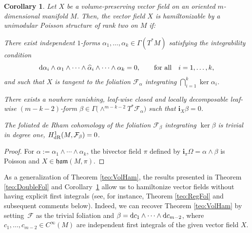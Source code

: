 \documentclass[pdftex]{sigma}%
\newcommand{\dd}{{\rm d}}
\newcommand{\ii}{\mathbf{i}}
\numberwithin{equation}{section}
\newtheorem{Corollary}[Theorem]{Corollary}
\begin{document}
\begin{Corollary}\label{cor:DoubleFol}
Let $X$ be a volume-preserving vector field on an oriented $m$-dimensional mani\-fold $M$. Then, the vector field $X$ is hamiltonizable by a unimodular Poisson structure of rank two on $M$ if:
 \begin{enumerate}\itemsep=0pt
 \item[$1.$] There exist independent $1$-forms $\alpha_1,\dots,\alpha_k\in\Gamma(T^{*}M)$ satisfying the integrability condition
 \begin{equation*}%
 \dd\alpha_{i} \wedge \alpha_{1} \wedge \cdots \wedge \widehat{\alpha}_{i} \wedge \cdots \wedge \alpha_{k} = 0, \qquad \text{for all}\quad i=1,\dots,k,
 \end{equation*}
 and such that $X$ is tangent to the foliation $\mathcal{F}_{\alpha}$ integrating $\bigcap_{i=1}^{k}\ker\alpha_{i}$.
{\sloppy \item [$2.$] There exists a nowhere vanishing, leaf-wise closed and locally decomposable leaf-wise $(m-k-2)$-form $\beta \in \Gamma\big({\wedge}^{m-k-2}T^{*}\mathcal{F}_{\alpha}\big)$ such that $\ii_{X}\beta = 0$.

}

 \item[$3.$] The foliated de Rham cohomology of the foliation $\mathcal{F}_{\beta}$ integrating $\ker\beta$ is trivial in degree one, $H^{1}_{{\rm dR}}(M,\mathcal{F}_{\beta})=0$.
 \end{enumerate}
\end{Corollary}
\begin{proof}
For $\alpha := \alpha_1 \wedge \cdots \wedge \alpha_k$, the bivector field $\pi$ defined by $\ii_{\pi}\Omega = \alpha\wedge\beta$
is Poisson and $X \in \mathfrak{ham}(M,\pi)$.
\end{proof}

As a generalization of Theorem \ref{teo:VolHam}, the results presented in Theorem \ref{teo:DoubleFol} and Corollary~\ref{cor:DoubleFol} allow us to hamiltonize vector fields without having explicit first integrals (see, for ins\-tance, Theorem \ref{teo:RegFol} and subsequent comments below). Indeed, we can recover Theorem \ref{teo:VolHam} by setting~$\mathcal{F}$ as the trivial foliation and $\beta = \dd c_1 \wedge \cdots \wedge \dd c_{m-2}$, where $c_1, \dots, c_{m-2} \in C^{\infty}(M)$ are independent first integrals of the given vector field $X$.
\end{document}
